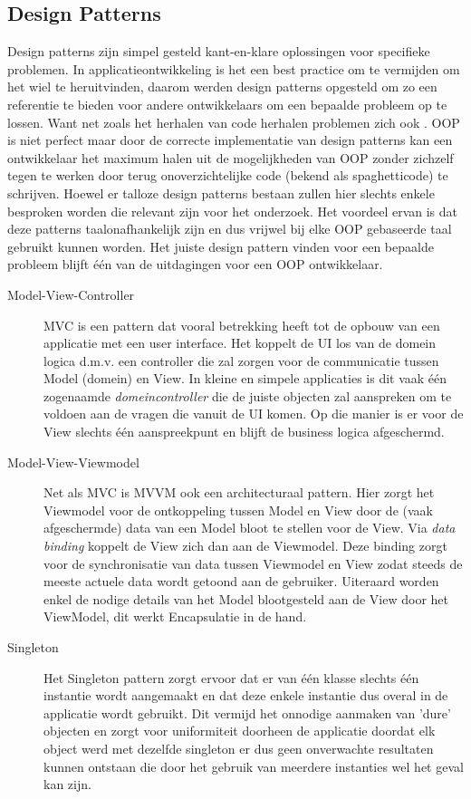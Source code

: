 \subsection{Design Patterns}
Design patterns zijn simpel gesteld kant-en-klare oplossingen voor specifieke problemen. In applicatieontwikkeling is het een best practice om te vermijden om het wiel te heruitvinden, daarom werden design patterns opgesteld om zo een referentie te bieden voor andere ontwikkelaars om een bepaalde probleem op te lossen. Want net zoals het herhalen van code herhalen problemen zich ook . OOP is niet perfect maar door de correcte implementatie van design patterns kan een ontwikkelaar het maximum halen uit de mogelijkheden van OOP zonder zichzelf tegen te werken door terug onoverzichtelijke code (bekend als spaghetticode) te schrijven. Hoewel er talloze design patterns bestaan zullen hier slechts enkele besproken worden die relevant zijn voor het onderzoek. Het voordeel ervan is dat deze patterns taalonafhankelijk zijn en dus vrijwel bij elke OOP gebaseerde taal gebruikt kunnen worden. Het juiste design pattern vinden voor een bepaalde probleem blijft één van de uitdagingen voor een OOP ontwikkelaar.

\begin{description}
  \item [Model-View-Controller] MVC is een pattern dat vooral betrekking heeft tot de opbouw van een applicatie met een user interface. Het koppelt de UI los van de domein logica d.m.v. een controller die zal zorgen voor de communicatie tussen Model (domein) en View. In kleine en simpele applicaties is dit vaak één zogenaamde \textit{domeincontroller} die de juiste objecten zal aanspreken om te voldoen aan de vragen die vanuit de UI komen. Op die manier is er voor de View slechts één aanspreekpunt en blijft de business logica afgeschermd.
  \item [Model-View-Viewmodel] Net als MVC is MVVM ook een architecturaal pattern. Hier zorgt het Viewmodel voor de ontkoppeling tussen Model en View door de (vaak afgeschermde) data van een Model bloot te stellen voor de View. Via \textit{data binding} koppelt de View zich dan aan de Viewmodel. Deze binding zorgt voor de synchronisatie van data tussen Viewmodel en View zodat steeds de meeste actuele data wordt getoond aan de gebruiker. Uiteraard worden enkel de nodige details van het Model blootgesteld aan de View door het ViewModel, dit werkt Encapsulatie in de hand.
  \item [Singleton] Het Singleton pattern zorgt ervoor dat er van één klasse slechts één instantie wordt aangemaakt en dat deze enkele instantie dus overal in de applicatie wordt gebruikt. Dit vermijd het onnodige aanmaken van 'dure' objecten en zorgt voor uniformiteit doorheen de applicatie doordat elk object werd met dezelfde singleton er dus geen onverwachte resultaten kunnen ontstaan die door het gebruik van meerdere instanties wel het geval kan zijn.
\end{description}

